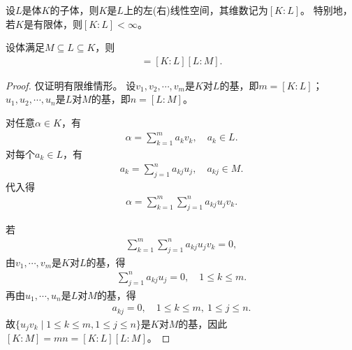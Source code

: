 \documentclass[../../main.tex]{subfiles}%
\begin{document}
\begin{example}
设$L$是体$K$的子体，则$K$是$L$上的左(右)线性空间，其维数记为$[K:L]$。
特别地，若$K$是有限体，则$[K:L]<\infty$。
\end{example}

\begin{theorem}
设体满足$M\subseteq L\subseteq K$，则
\begin{align*}
[K:M]=[K:L][L:M].
\end{align*}
\end{theorem}
\begin{proof}
仅证明有限维情形。
设$v_1,v_2,\cdots,v_m$是$K$对$L$的基，即$m=[K:L]$；$u_1,u_2,\cdots,u_n$是$L$对$M$的基，即$n=[L:M]$。

对任意$\alpha\in K$，有
\begin{align*}
\alpha=\sum\limits_{k=1}^{m}a_kv_k,\quad a_k\in L.
\end{align*}
对每个$a_k\in L$，有
\begin{align*}
a_k=\sum\limits_{j=1}^{n}a_{kj}u_j,\quad a_{kj}\in M.
\end{align*}
代入得
\begin{align*}
\alpha=\sum\limits_{k=1}^{m}\sum\limits_{j=1}^{n}a_{kj}u_jv_k.
\end{align*}

若
\begin{align*}
\sum\limits_{k=1}^{m}\sum\limits_{j=1}^{n}a_{kj}u_jv_k=0,
\end{align*}
由$v_1,\cdots,v_m$是$K$对$L$的基，得
\begin{align*}
\sum\limits_{j=1}^{n}a_{kj}u_j=0,\quad 1\leqslant k\leqslant m.
\end{align*}
再由$u_1,\cdots,u_n$是$L$对$M$的基，得
\begin{align*}
a_{kj}=0,\quad 1\leqslant k\leqslant m,\ 1\leqslant j\leqslant n.
\end{align*}
故$\{u_jv_k\mid 1\leqslant k\leqslant m,1\leqslant j\leqslant n\}$是$K$对$M$的基，因此$[K:M]=mn=[K:L][L:M]$。
\end{proof}
\end{document}
